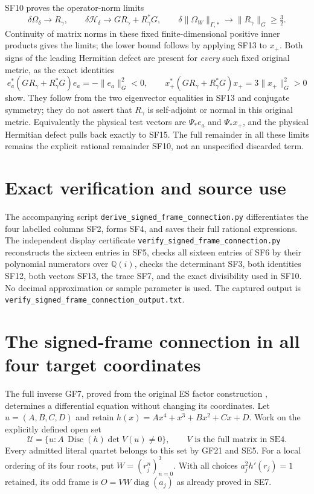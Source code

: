 \documentclass[11pt]{article}
\begin{document}
SF10 proves the operator-norm limits
\begin{equation}
 \delta\Omega_\delta\longrightarrow R_\gamma,
 \qquad
 \delta\mathscr H_\delta\longrightarrow
       G R_\gamma+R_\gamma^*G,
 \qquad
 \delta\|\Omega_W\|_{\Gamma,*}
       \longrightarrow\|R_\gamma\|_G\ge\tfrac32.
 \tag{SF17}
\end{equation}
Continuity of matrix norms in these fixed finite-dimensional
positive inner products gives the limits; the lower bound
follows by applying SF13 to $x_+$. Both signs of the leading
Hermitian defect are present for \emph{every} such fixed
original metric, as the exact identities
\begin{equation}
 e_a^*(G R_\gamma+R_\gamma^*G)e_a=-\|e_a\|_G^2<0,
 \qquad
 x_+^*(G R_\gamma+R_\gamma^*G)x_+=3\|x_+\|_G^2>0
 \tag{SF18}
\end{equation}
show. They follow from the two eigenvector equalities in SF13
and conjugate symmetry; they do not assert that $R_\gamma$
is self-adjoint or normal in this original metric. Equivalently
the physical test vectors are $\Psi_*e_a$ and $\Psi_*x_+$,
and the physical Hermitian defect pulls back exactly to SF15.
The full remainder in all these limits remains the explicit
rational remainder SF10, not an unspecified discarded term.

\section{Exact verification and source use}
The accompanying script
\texttt{derive\_signed\_frame\_connection.py} differentiates
the four labelled columns SF2, forms SF4, and saves their full
rational expressions. The independent display certificate
\texttt{verify\_signed\_frame\_connection.py} reconstructs
the sixteen entries in SF5, checks all sixteen entries of
SF6 by their polynomial numerators over $\mathbb Q(i)$,
checks the determinant SF3, both identities SF12, both vectors
SF13, the trace SF7, and the exact divisibility used in SF10.
No decimal approximation or sample parameter is used.
The captured output is
\texttt{verify\_signed\_frame\_connection\_output.txt}.

\section{The signed-frame connection in all four target coordinates}
The full inverse GF7, proved from the original ES factor construction
\cite{ES488,ES}, determines a differential equation without changing its
coordinates. Let $u=(A,B,C,D)$ and retain
$h(x)=Ax^4+x^3+Bx^2+Cx+D$. Work on the explicitly defined open set
\[
 \mathcal U=\{u:A\,\operatorname{Disc}(h)\det V(u)\ne0\},
 \qquad V\text{ is the full matrix in SE4}.
 \tag{SC1}
\]
Every admitted literal quartet belongs to this set by GF21 and SE5.
For a local ordering of its four roots, put $W=(r_j^n)_{n=0}^3$.
With all choices $a_j^2h'(r_j)=1$ retained, its odd frame is
$O=VW\operatorname{diag}(a_j)$ as already proved in SE7.
\end{document}
